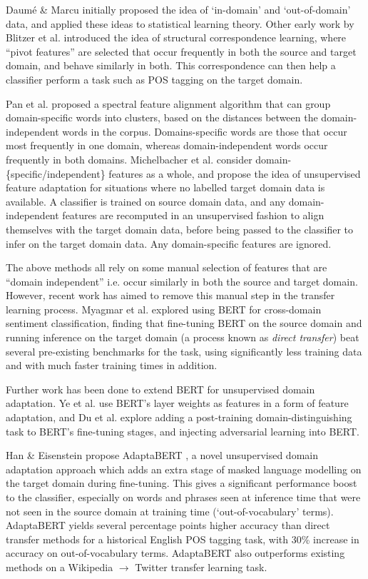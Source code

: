 Daumé \& Marcu \cite{daume} initially proposed the idea of `in-domain' and `out-of-domain' data, and applied these ideas to statistical learning theory. Other early work by Blitzer et al. \cite{scl} introduced the idea of structural correspondence learning, where ``pivot features'' are selected that occur frequently in both the source and target domain, and behave similarly in both. This correspondence can then help a classifier perform a task such as POS tagging on the target domain.

Pan et al. \cite{pan-sfa} proposed a spectral feature alignment algorithm that can group domain-specific words into clusters, based on the distances between the domain-independent words in the corpus. Domains-specific words are those that occur most frequently in one domain, whereas domain-independent words occur frequently in both domains. Michelbacher et al. \cite{feature-adaptation} consider domain-\{specific/independent\} features as a whole, and propose the idea of unsupervised feature adaptation for situations where no labelled target domain data is available. A classifier is trained on source domain data, and any domain-independent features are recomputed in an unsupervised fashion to align themselves with the target domain data, before being passed to the classifier to infer on the target domain data. Any domain-specific features are ignored.

The above methods all rely on some manual selection of features that are ``domain independent'' i.e. occur similarly in both the source and target domain. However, recent work has aimed to remove this manual step in the transfer learning process. Myagmar et al. \cite{cdsc} explored using BERT for cross-domain sentiment classification, finding that fine-tuning BERT on the source domain and running inference on the target domain (a process known as \textit{direct transfer}) beat several pre-existing benchmarks for the task, using significantly less training data and with much faster training times in addition.

Further work has been done to extend BERT for unsupervised domain adaptation. Ye et al. \cite{bert-feature-adaptation} use BERT's layer weights as features in a form of feature adaptation, and Du et al. \cite{domain-aware-bert} explore adding a post-training domain-distinguishing task to BERT's fine-tuning stages, and injecting adversarial learning into BERT.

Han \& Eisenstein propose AdaptaBERT \cite{adaptabert}, a novel unsupervised domain adaptation approach which adds an extra stage of masked language modelling on the target domain during fine-tuning. This gives a significant performance boost to the classifier, especially on words and phrases seen at inference time that were not seen in the source domain at training time (`out-of-vocabulary' terms). AdaptaBERT yields several percentage points higher accuracy than direct transfer methods for a historical English POS tagging task, with 30\% increase in accuracy on out-of-vocabulary terms. AdaptaBERT also outperforms existing methods on a Wikipedia $ \rightarrow $ Twitter transfer learning task.

